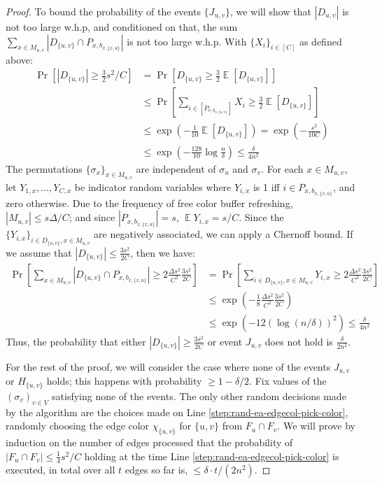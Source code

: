 \documentclass[10pt]{article}
\theoremstyle{definition}\newtheorem{definition}[lemma]{Definition}
\theoremstyle{remark}  \newtheorem*{remark}{Remark}
\DeclareMathOperator{\EE}{\mathbb{E}}
\begin{document}
\begin{proof}
  To bound the probability of the events $\{J_{u,v}\}$, we will show that $|D_{u,v}|$ is not too large w.h.p, and conditioned on that, the sum $\sum_{x \in M_{u,v}} |D_{\{u,v\}} \cap P_{x,b_{x,\{x,u\}}}|$ is not too large w.h.p. With $\{X_i\}_{i\in[C]}$ as defined above:
  \begin{align*}
    \Pr[ |D_{\{u,v\}}| \ge \frac{3}{2} s^2/C ] &= \Pr[ D_{\{u,v\}} \ge \frac{3}{2} \EE[D_{\{u,v\}}] ] \\
       &\le  \Pr[ \sum_{i \in [P_{v, b_{v,\{u,v\}}}]} X_i \ge \frac{3}{2} \EE[D_{\{u,v\}}] ] \\
       &\le \exp( - \frac{1}{10} \EE[D_{\{u,v\}}]) = \exp(- \frac{s^2}{10 C} ) \\
       &\le \exp(- \frac{128}{10} \log\frac{n}{\delta})\le \frac{\delta}{4 n^2}
  \end{align*}
  The permutations $\{\sigma_x\}_{x \in M_{u,v}}$ are independent of $\sigma_u$ and $\sigma_v$. For each $x \in M_{u,v}$, let $Y_{1,x},\ldots,Y_{C,x}$ be indicator random variables
  where $Y_{i,x}$ is 1 iff $i \in P_{x, b_{x,\{x,u\}}}$, and zero otherwise. Due to the frequency of free color buffer refreshing, $|M_{u,v}| \le s \Delta / C$; and since $|P_{x, b_{x,\{x,u\}}}| = s$, $\EE Y_{i,x} = s/C$. Since the $\{Y_{i,x}\}_{i \in D_{\{u,v\}}, x \in M_{u,v}}$ are negatively associated, we can apply a Chernoff bound. If we assume that $|D_{\{u,v\}}| \le \frac{3 s^2}{2 C}$, then we have:
  \begin{align*}
    \Pr\left[ \sum_{x \in M_{u,v}} |D_{\{u,v\}} \cap P_{x,b_{x,\{x,u\}}}| \ge 2 \frac{\Delta s^2}{C^2} \frac{3 s^2}{2 C}\right]
      &= \Pr\left[ \sum_{i \in D_{\{u,v\}}, x \in M_{u,v}} Y_{i,x} \ge 2 \frac{\Delta s^2}{C^2} \frac{3 s^2}{2 C} \right] \\
      &\le \exp\left( - \frac{1}{8} \frac{\Delta s^2}{C^2} \frac{3 s^2}{2 C} \right) \\
      &\le \exp(- 12 (\log(n/\delta))^2) \le \frac{\delta}{4 n^2}
  \end{align*}
  Thus, the probability that either $|D_{\{u,v\}}| \ge \frac{3 s^2}{2 C}$ or event $J_{u,v}$ does not hold is $\frac{\delta}{2 n^2}$.
    
  For the rest of the proof, we will consider the case where none of the events $J_{u,v}$ or $H_{\{u,v\}}$ holds; this happens with probability $\ge 1 - \delta/2$. Fix values of the $(\sigma_v)_{v\in V}$ satisfying none of the events. The only other random decisions made
  by the algorithm are the choices made on Line \ref{step:rand-ea-edgecol-pick-color}, randomly choosing the edge color $\chi_{\{u,v\}}$ for $\{u,v\}$ from $F_u \cap F_v$. We will prove by induction on
  the number of edges processed that the probability of $|F_u \cap F_v| \le \frac{1}{4} s^2 / C$ holding at the time Line \ref{step:rand-ea-edgecol-pick-color} is executed, in total over all $t$ edges so far is, $\le \delta \cdot t / (2n^2)$.
  

\end{proof}
\end{document}
